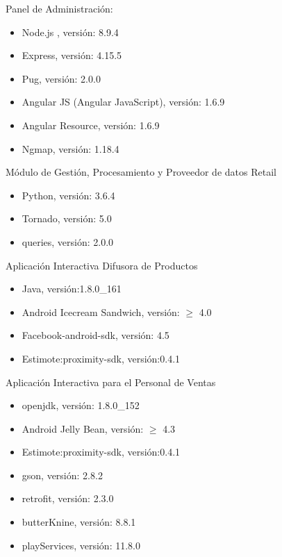 \begin{enumerate}[1.]
    Panel de Administración: 
    \begin{itemize}
    \item Node.js , versión: 8.9.4
    \item Express, versión: 4.15.5
    \item Pug, versión: 2.0.0
    \item Angular JS (Angular JavaScript), versión: 1.6.9
    \item Angular Resource, versión: 1.6.9
    \item Ngmap, versión: 1.18.4
    \end{itemize}
	Módulo de Gestión, Procesamiento  y Proveedor de datos Retail
	\begin{itemize}
	\item Python, versión: 3.6.4
	\item Tornado, versión: 5.0
	\item queries, versión: 2.0.0
	\end{itemize}	    
	Aplicación Interactiva Difusora de Productos
	\begin{itemize}
	\item Java, versión:1.8.0\_161
	\item Android Icecream Sandwich, versión: $\geq$ 4.0
	\item Facebook-android-sdk, versión: 4.5
	\item Estimote:proximity-sdk, versión:0.4.1
	\end{itemize}
	Aplicación Interactiva para el Personal de Ventas
	\begin{itemize}
	\item openjdk, versión: 1.8.0\_152
	\item Android Jelly Bean, versión: $\geq$ 4.3
	\item Estimote:proximity-sdk, versión:0.4.1
	\item gson, versión: 2.8.2
	\item retrofit, versión: 2.3.0
	\item butterKnine, versión: 8.8.1
	\item playServices, versión: 11.8.0
	\end{itemize}
\end{enumerate}


